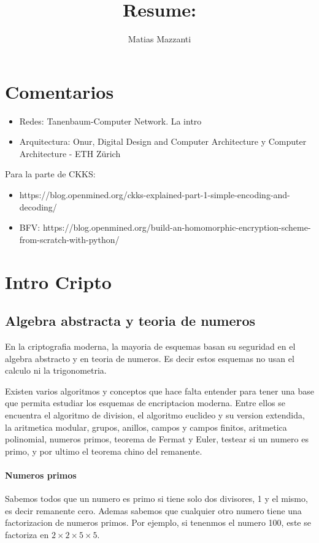 \documentclass[12pt, oneside]{article}
\title{Resume: }
\author{Matias Mazzanti}
\date{}
\begin{document}
\maketitle
\tableofcontents

\vspace{.25in}
\section{Comentarios}
\begin{itemize}
  \item Redes: Tanenbaum-Computer Network. La intro
  \item Arquitectura: Onur, Digital Design and Computer Architecture y Computer Architecture - ETH Zürich
\end{itemize}

Para la parte de CKKS:
\begin{itemize}
  \item https://blog.openmined.org/ckks-explained-part-1-simple-encoding-and-decoding/
  \item BFV: https://blog.openmined.org/build-an-homomorphic-encryption-scheme-from-scratch-with-python/
\end{itemize}
\section{Intro Cripto}

\subsection{Algebra abstracta y teoria de numeros}

En la criptografia moderna, la mayoria de esquemas basan su seguridad en
el algebra abstracto y en teoria de numeros.
Es decir estos esquemas no usan el calculo ni la trigonometria.

Existen varios algoritmos y conceptos que hace falta entender para tener una base que permita
estudiar los esquemas de encriptacion moderna.
Entre ellos se encuentra el algoritmo de division, el algoritmo euclideo y su version
extendida, la aritmetica modular, grupos, anillos, campos y campos finitos,
aritmetica polinomial, numeros primos, teorema de Fermat y Euler, testear si un numero es primo,
 y por ultimo el teorema chino del remanente.

 \paragraph{Numeros primos}
Sabemos todos que un numero es primo si tiene solo dos divisores, 1 y el mismo, es decir remanente cero.
Ademas sabemos que cualquier otro numero tiene una factorizacion de numeros primos.
Por ejemplo, si tenenmos el numero 100, este se factoriza en $2\times2\times5\times5$.
\end{document}
